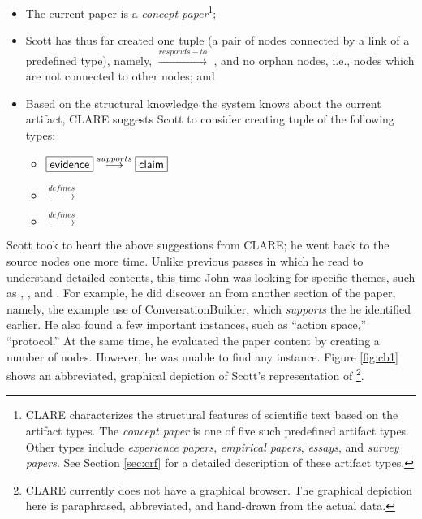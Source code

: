 \begin{itemize}
\item The current paper is a {\it concept paper\/}\footnote{CLARE
  characterizes the structural features of scientific text based on the
  artifact types.  The {\it concept paper\/} is one of five such
  predefined artifact types. Other types include {\it experience
  papers\/}, {\it empirical papers\/}, {\it essays\/}, and {\it survey
  papers\/}. See Section \ref{sec:crf} for a detailed description of these
  artifact types.};
  
\item Scott has thus far created one tuple (a pair of nodes connected by
  a link of a predefined type), namely,  \( \stackrel{
  responds-to}{\longrightarrow} \) , and no orphan
  nodes, i.e., nodes which are not connected to other nodes; and
  
\item Based on the structural knowledge the system knows about the
  current artifact, CLARE suggests Scott to consider creating tuple of
  the following types:

  \begin{itemize}
  \item \( \fbox{{\sf evidence}}
    \stackrel{supports}{\longrightarrow} \fbox{{\sf claim}} \)

  \item {} \( \stackrel{defines}{\longrightarrow} \)
    
  \item {} \( \stackrel{defines}{\longrightarrow} \)
  \end{itemize}
\end{itemize}

Scott took to heart the above suggestions from CLARE; he went back to the
source nodes one more time. Unlike previous passes in which he read to
understand detailed contents, this time John was looking for specific
themes, such as , , and . For example, he did discover an  from
another section of the paper, namely, the example use of
ConversationBuilder, which {\it supports\/} the  he
identified earlier. He also found a few important 
instances, such as ``action space,'' ``protocol.''  At the same time, he
evaluated the paper content by creating a number of 
nodes. However, he was unable to find any  instance.
Figure \ref{fig:cb1} shows an abbreviated, graphical depiction of Scott's
representation of \cite{Kaplan92}\footnote{CLARE currently does not have a
graphical browser. The graphical depiction here is paraphrased,
abbreviated, and hand-drawn from the actual data.}.

